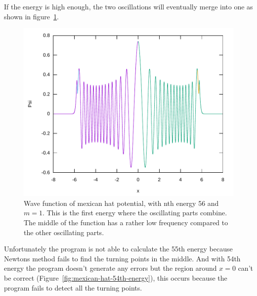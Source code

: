 \documentclass[11pt,DIV=10,final]{scrreprt} %
\begin{document}
{\begin{minipage}{\textwidth}
If the energy is high enough, the two oscillations will eventually merge into one as shown in figure~\ref{fig:mexican-hat-56th-energy}.
\begin{figure}[H]
  \centering
  \includegraphics[width=\textwidth]{plots/mexican-hat-56.pdf}
  \caption{
    Wave function of mexican hat potential, with nth energy 56 and $m = 1$. This is the first energy where the oscillating parts combine. The middle of the function has a rather low frequency compared
    to the other oscillating parts.
  }\label{fig:mexican-hat-56th-energy}
\end{figure}
\end{minipage}

\begin{minipage}{\textwidth}
  Unfortunately the program is not able to calculate the 55th energy because Newtons method fails to find the turning points in the middle. And with 54th energy the program doesn't generate any errors
  but the region around $x = 0$ can't be correct (Figure~\ref{fig:mexican-hat-54th-energy}), this occurs because the program fails to detect all the turning points.


\end{minipage}}
\end{document}
